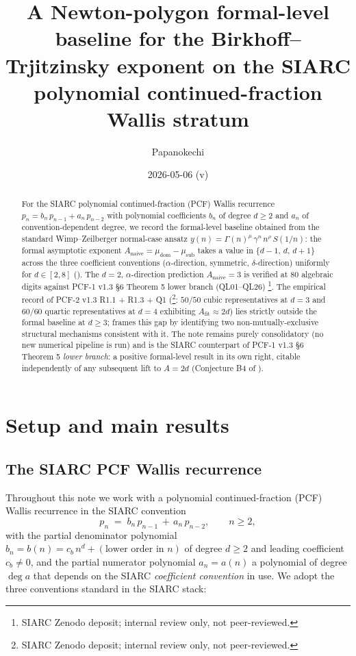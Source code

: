 \documentclass[11pt,reqno]{amsart}
\title[A Newton-polygon formal-level baseline]
      {A Newton-polygon formal-level baseline for the
       Birkhoff--Trjitzinsky exponent on the SIARC polynomial
       continued-fraction Wallis stratum}
\author{Papanokechi}
\date{2026-05-06 (v\version)}
\theoremstyle{plain}
\theoremstyle{definition}
\theoremstyle{remark}
\newcommand{\Anaive}{A_{\mathrm{naive}}}
\newcommand{\Afit}{A_{\mathrm{fit}}}
\newcommand{\dega}{\deg a}
\begin{document}
\begin{abstract}
For the SIARC polynomial continued-fraction (PCF) Wallis recurrence
$p_n = b_n\,p_{n-1} + a_n\,p_{n-2}$ with polynomial coefficients
$b_n$ of degree $d \ge 2$ and $a_n$ of convention-dependent degree,
we record the formal-level baseline obtained from the standard
Wimp--Zeilberger normal-case ansatz
$y(n) = \Gamma(n)^{\mu}\,\gamma^{n}\,n^{\rho}\,S(1/n)$:
the formal asymptotic exponent
$\Anaive = \mu_{\mathrm{dom}} - \mu_{\mathrm{sub}}$ takes a value
in $\{d-1,\,d,\,d+1\}$ across the three coefficient conventions
(\emph{$\alpha$}-direction, symmetric, \emph{$\delta$}-direction)
uniformly for $d \in [2,8]$ (). The
$d=2$, $\alpha$-direction prediction $\Anaive = 3$ is verified
at $80$ algebraic digits against PCF-1 v1.3 \S6 Theorem 5 lower
branch (QL01--QL26)
\cite{papanokechi_pcf1_v13}\footnote{SIARC Zenodo deposit;
internal review only, not peer-reviewed.}. The empirical record of
PCF-2 v1.3 R1.1 + R1.3 + Q1
(\cite{papanokechi_pcf2_v13}\footnote{SIARC Zenodo deposit; internal
review only, not peer-reviewed.}: $50/50$ cubic representatives at
$d=3$ and $60/60$ quartic representatives at $d=4$ exhibiting
$\Afit \approx 2d$) lies strictly outside the formal baseline
at $d \ge 3$;  frames this gap by
identifying two non-mutually-exclusive structural mechanisms
consistent with it. The note remains purely consolidatory
(no new numerical pipeline is run) and is the SIARC counterpart
of PCF-1 v1.3 \S6 Theorem 5 \emph{lower branch}: a positive
formal-level result in its own right, citable independently of
any subsequent lift to $A = 2d$
(Conjecture B4 of \cite{papanokechi_pcf2_v13}).
\end{abstract}

\maketitle

\section{Setup and main results}
\label{sec:setup}

\subsection{The SIARC PCF Wallis recurrence}
Throughout this note we work with a polynomial continued-fraction
(PCF) Wallis recurrence in the SIARC convention
\begin{equation}
\label{eq:wallis}
  p_n \;=\; b_n\,p_{n-1} \,+\, a_n\,p_{n-2},
  \qquad n \ge 2,
\end{equation}
with the partial denominator polynomial
$b_n = b(n) = c_b\,n^{d} + (\text{lower order in }n)$
of degree $d \ge 2$ and leading coefficient $c_b \ne 0$, and the
partial numerator polynomial $a_n = a(n)$ a polynomial of degree
$\dega$ that depends on the SIARC \emph{coefficient convention}
in use. We adopt the three conventions standard in the
SIARC stack:
\end{document}
